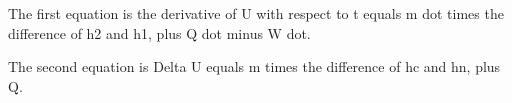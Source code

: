 The first equation is the derivative of U with respect to t equals m dot times the difference of h2 and h1, plus Q dot minus W dot.

The second equation is Delta U equals m times the difference of hc and hn, plus Q.